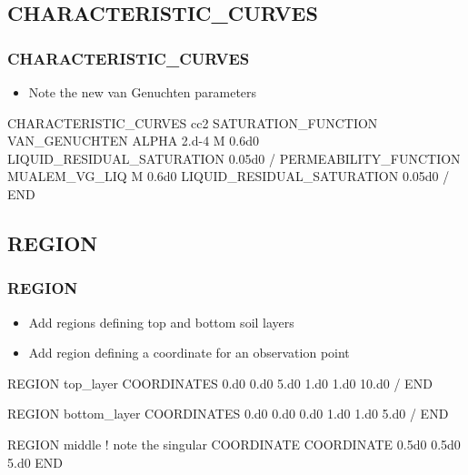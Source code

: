 \documentclass{beamer}
\newcommand\bluecomment[1]{{{\color{blue} #1}}}
\newcommand\magentacomment[1]{{{\color{magenta} #1}}}
\begin{document}
\subsection{CHARACTERISTIC\_CURVES}

\begin{frame}[fragile]\frametitle{CHARACTERISTIC\_CURVES}

\begin{itemize}
\item Note the new van Genuchten parameters
\end{itemize}

\begin{semiverbatim}
\magentacomment{
CHARACTERISTIC_CURVES cc2
  SATURATION_FUNCTION VAN_GENUCHTEN
    ALPHA 2.d-4
    M 0.6d0
    LIQUID_RESIDUAL_SATURATION 0.05d0
  /
  PERMEABILITY_FUNCTION MUALEM_VG_LIQ
    M 0.6d0
    LIQUID_RESIDUAL_SATURATION 0.05d0
  /
END}

\end{semiverbatim}

\end{frame}

\subsection{REGION}

\begin{frame}\frametitle{REGION}

\begin{itemize}
  \item Add regions defining top and bottom soil layers
  \item Add region defining a coordinate for an observation point
\end{itemize}

\begin{semiverbatim}


\magentacomment{
REGION top_layer
  COORDINATES
    0.d0 0.d0 5.d0
    1.d0 1.d0 10.d0
  /
END





REGION bottom_layer
  COORDINATES
    0.d0 0.d0 0.d0
    1.d0 1.d0 5.d0
  /
END

REGION middle    \bluecomment{! note the singular COORDINATE}
  COORDINATE 0.5d0 0.5d0 5.d0
END}

\end{semiverbatim}

\end{frame}
\end{document}
